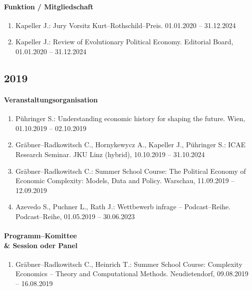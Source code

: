 \paragraph{Funktion / Mitgliedschaft}
\begin{enumerate}[leftmargin=*, labelsep=0.5cm]
\item Kapeller J.: Jury Vorsitz Kurt--Rothschild--Preis. 01.01.2020 -- 31.12.2024
\item Kapeller J.: Review of Evolutionary Political Economy. Editorial Board, 01.01.2020 -- 31.12.2024
\end{enumerate}
\subsection*{2019}
\paragraph{Veranstaltungsorganisation}
\begin{enumerate}[leftmargin=*, labelsep=0.5cm]
\item Pühringer S.: Understanding economic history for shaping the future. Wien, 01.10.2019 -- 02.10.2019
\item Gräbner--Radkowitsch C., Hornykewycz A., Kapeller J., Pühringer S.: ICAE Research Seminar. JKU Linz (hybrid), 10.10.2019 -- 31.10.2024
\item Gräbner--Radkowitsch C.: Summer School Course: The Political Economy of Economic Complexity: Models, Data and Policy. Warschau, 11.09.2019 -- 12.09.2019
\item Azevedo S., Puchner L., Rath J.: Wettbewerb infrage -- Podcast--Reihe. Podcast--Reihe, 01.05.2019 -- 30.06.2023
\end{enumerate}

\paragraph{Programm--Komittee \\\& Session oder Panel}
\begin{enumerate}[leftmargin=*, labelsep=0.5cm]
\item Gräbner--Radkowitsch C., Heinrich T.: Summer School Course: Complexity Economics -- Theory and Computational Methods. Neudietendorf, 09.08.2019 -- 16.08.2019
\end{enumerate}

